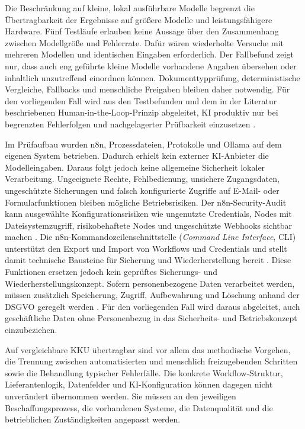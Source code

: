 \documentclass[a4paper,12pt]{article}
\begin{document}
Die Beschränkung auf kleine, lokal ausführbare Modelle begrenzt die Übertragbarkeit der Ergebnisse auf größere Modelle und leistungsfähigere Hardware. Fünf Testläufe erlauben keine Aussage über den Zusammenhang zwischen Modellgröße und Fehlerrate. Dafür wären wiederholte Versuche mit mehreren Modellen und identischen Eingaben erforderlich. Der Fallbefund zeigt nur, dass auch eng geführte kleine Modelle vorhandene Angaben übersehen oder inhaltlich unzutreffend einordnen können. Dokumenttypprüfung, deterministische Vergleiche, Fallbacks und menschliche Freigaben bleiben daher notwendig. Für den vorliegenden Fall wird aus den Testbefunden und dem in der Literatur beschriebenen Human-in-the-Loop-Prinzip abgeleitet, KI produktiv nur bei begrenzten Fehlerfolgen und nachgelagerter Prüfbarkeit einzusetzen \parencite{ng_systematic_2021}.

Im Prüfaufbau wurden n8n, Prozessdateien, Protokolle und Ollama auf dem eigenen System betrieben. Dadurch erhielt kein externer KI-Anbieter die Modelleingaben. Daraus folgt jedoch keine allgemeine Sicherheit lokaler Verarbeitung. Ungeeignete Rechte, Fehlbedienung, unsichere Zugangsdaten, ungeschützte Sicherungen und falsch konfigurierte Zugriffe auf E-Mail- oder Formularfunktionen bleiben mögliche Betriebsrisiken. Der n8n-Security-Audit kann ausgewählte Konfigurationsrisiken wie ungenutzte Credentials, Nodes mit Dateisystemzugriff, risikobehaftete Nodes und ungeschützte Webhooks sichtbar machen \parencite{n8n_docs_2026}. Die n8n-Kommandozeilenschnittstelle (\textit{Command Line Interface}, CLI) unterstützt den Export und Import von Workflows und Credentials und stellt damit technische Bausteine für Sicherung und Wiederherstellung bereit \parencite{n8n_docs_2026}. Diese Funktionen ersetzen jedoch kein geprüftes Sicherungs- und Wiederherstellungskonzept. Sofern personenbezogene Daten verarbeitet werden, müssen zusätzlich Speicherung, Zugriff, Aufbewahrung und Löschung anhand der DSGVO geregelt werden \parencite{eu_dsgvo_2016}. Für den vorliegenden Fall wird daraus abgeleitet, auch geschäftliche Daten ohne Personenbezug in das Sicherheits- und Betriebskonzept einzubeziehen.

Auf vergleichbare KKU übertragbar sind vor allem das methodische Vorgehen, die Trennung zwischen automatisierten und menschlich freizugebenden Schritten sowie die Behandlung typischer Fehlerfälle. Die konkrete Workflow-Struktur, Lieferantenlogik, Datenfelder und KI-Konfiguration können dagegen nicht unverändert übernommen werden. Sie müssen an den jeweiligen Beschaffungsprozess, die vorhandenen Systeme, die Datenqualität und die betrieblichen Zuständigkeiten angepasst werden.
\end{document}
